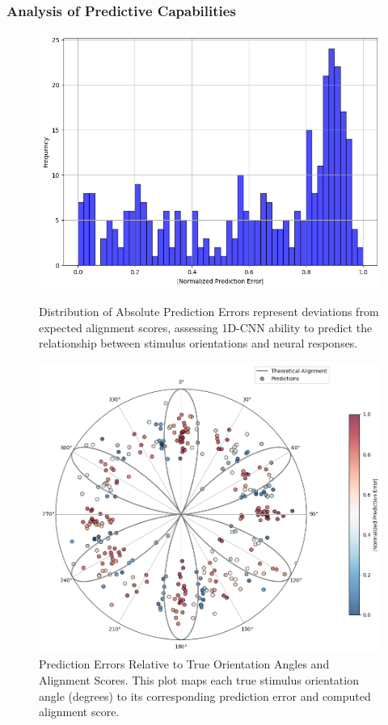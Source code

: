 \documentclass[a4paper]{article}
\begin{document}
\subsubsection{Analysis of Predictive Capabilities}

\begin{figure}[htbp]
    \centering
    \begin{minipage}{0.43\textwidth}
        \centering
        \includegraphics[width=\linewidth]{22.png} %
        \caption{Distribution of Absolute Prediction Errors  represent deviations from expected alignment scores, assessing 1D-CNN ability to predict the relationship between stimulus orientations and neural responses.}
        \label{fig:first-image-label}
    \end{minipage}\hfill
    \begin{minipage}{0.53\textwidth}
        \centering
        \includegraphics[width=\linewidth]{predictiveerrors1D.png}
        \caption{Prediction Errors Relative to True Orientation Angles and Alignment Scores. This plot maps each true stimulus orientation angle (degrees) to its corresponding prediction error and computed alignment score.}
        \label{fig:1D-CNN histogram}
    \end{minipage}
\end{figure}
\end{document}
